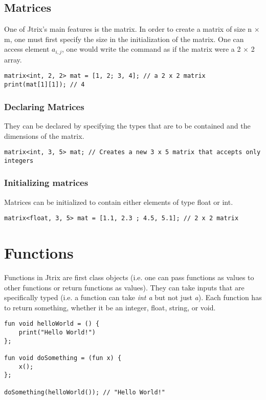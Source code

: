 \documentclass[12pt]{report}
\begin{document}
\subsection{Matrices}
One of Jtrix's main features is the matrix. In order to create a matrix of size n $\times$ m, one must first specify the size in the initialization of the matrix. One can access element $a_{i,j}$, one would write the command as if the matrix were a 2 $\times$ 2 array.
\begin{lstlisting}
matrix<int, 2, 2> mat = [1, 2; 3, 4]; // a 2 x 2 matrix
print(mat[1][1]); // 4 
\end{lstlisting}
\subsubsection{Declaring Matrices}
They can be declared by specifying the types that are to be contained and the dimensions of the matrix.
\begin{lstlisting}
matrix<int, 3, 5> mat; // Creates a new 3 x 5 matrix that accepts only integers
\end{lstlisting}
\subsubsection{Initializing matrices}
Matrices can be initialized to contain either elements of type float or int. 
\begin{lstlisting}
matrix<float, 3, 5> mat = [1.1, 2.3 ; 4.5, 5.1]; // 2 x 2 matrix
\end{lstlisting}

\section{Functions}
Functions in Jtrix are first class objects (i.e. one can pass functions as values to other functions or return functions as values). They can take inputs that are specifically typed (i.e. a function can take \textit{int a} but not just \textit{a}). Each function has to return something, whether it be an integer, float, string, or void.
\begin{lstlisting}
fun void helloWorld = () {
	print("Hello World!")
};

fun void doSomething = (fun x) {
	x();
};

doSomething(helloWorld()); // "Hello World!"
\end{lstlisting}
\end{document}
